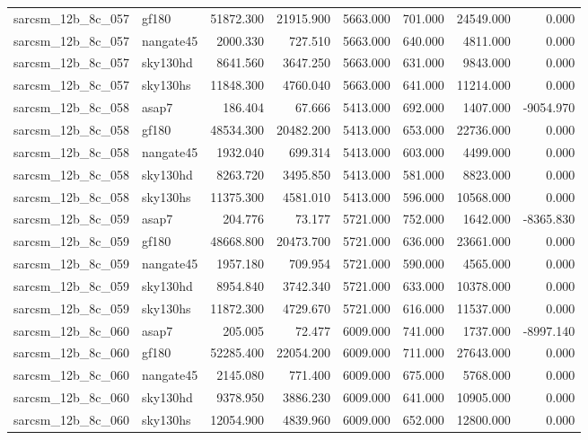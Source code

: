 \begin{tabular}{llrrrrrr}
sarcsm\_12b\_8c\_057 & gf180 & 51872.300 & 21915.900 & 5663.000 & 701.000 & 24549.000 & 0.000 \\
sarcsm\_12b\_8c\_057 & nangate45 & 2000.330 & 727.510 & 5663.000 & 640.000 & 4811.000 & 0.000 \\
sarcsm\_12b\_8c\_057 & sky130hd & 8641.560 & 3647.250 & 5663.000 & 631.000 & 9843.000 & 0.000 \\
sarcsm\_12b\_8c\_057 & sky130hs & 11848.300 & 4760.040 & 5663.000 & 641.000 & 11214.000 & 0.000 \\
sarcsm\_12b\_8c\_058 & asap7 & 186.404 & 67.666 & 5413.000 & 692.000 & 1407.000 & -9054.970 \\
sarcsm\_12b\_8c\_058 & gf180 & 48534.300 & 20482.200 & 5413.000 & 653.000 & 22736.000 & 0.000 \\
sarcsm\_12b\_8c\_058 & nangate45 & 1932.040 & 699.314 & 5413.000 & 603.000 & 4499.000 & 0.000 \\
sarcsm\_12b\_8c\_058 & sky130hd & 8263.720 & 3495.850 & 5413.000 & 581.000 & 8823.000 & 0.000 \\
sarcsm\_12b\_8c\_058 & sky130hs & 11375.300 & 4581.010 & 5413.000 & 596.000 & 10568.000 & 0.000 \\
sarcsm\_12b\_8c\_059 & asap7 & 204.776 & 73.177 & 5721.000 & 752.000 & 1642.000 & -8365.830 \\
sarcsm\_12b\_8c\_059 & gf180 & 48668.800 & 20473.700 & 5721.000 & 636.000 & 23661.000 & 0.000 \\
sarcsm\_12b\_8c\_059 & nangate45 & 1957.180 & 709.954 & 5721.000 & 590.000 & 4565.000 & 0.000 \\
sarcsm\_12b\_8c\_059 & sky130hd & 8954.840 & 3742.340 & 5721.000 & 633.000 & 10378.000 & 0.000 \\
sarcsm\_12b\_8c\_059 & sky130hs & 11872.300 & 4729.670 & 5721.000 & 616.000 & 11537.000 & 0.000 \\
sarcsm\_12b\_8c\_060 & asap7 & 205.005 & 72.477 & 6009.000 & 741.000 & 1737.000 & -8997.140 \\
sarcsm\_12b\_8c\_060 & gf180 & 52285.400 & 22054.200 & 6009.000 & 711.000 & 27643.000 & 0.000 \\
sarcsm\_12b\_8c\_060 & nangate45 & 2145.080 & 771.400 & 6009.000 & 675.000 & 5768.000 & 0.000 \\
sarcsm\_12b\_8c\_060 & sky130hd & 9378.950 & 3886.230 & 6009.000 & 641.000 & 10905.000 & 0.000 \\
sarcsm\_12b\_8c\_060 & sky130hs & 12054.900 & 4839.960 & 6009.000 & 652.000 & 12800.000 & 0.000 \\

\end{tabular}
